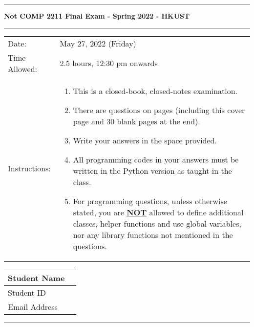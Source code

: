 \documentclass[11pt]{exam}
\begin{document}
\begin{center}
\rule{\textwidth}{2.5pt}

\textbf{\Large{Not COMP 2211 Final Exam - Spring 2022 - HKUST}}
\vspace{-0.2cm}
\rule{\textwidth}{2.5pt}

\vspace{0.3cm}
\renewcommand{\arraystretch}{1.2}
\sffamily
\begin{tabular}{lp{14.5cm}}
    Date: & May 27, 2022 (Friday) \\
    Time Allowed: & 2.5 hours, 12:30 pm onwards \\
    Instructions: & \begin{enumerate}[leftmargin=*,]
        \item This is a closed-book, closed-notes examination.
        \item There are \textbf{\underline{\rmfamily 8}} questions on \textbf{\rmfamily \pageref{LastPage}} pages (including this cover page and 30 blank \newline pages at the end).
        \item Write your answers in the space provided.
        \item All programming codes in your answers must be written in the Python version \newline as taught in the class.
        \item For programming questions, unless otherwise stated, you are \textbf{\underline{\rmfamily NOT}} allowed \newline to define additional classes, helper functions and use global variables, nor any \newline library functions not mentioned in the questions.
    \end{enumerate}\\
\end{tabular}
\rmfamily

\renewcommand{\arraystretch}{1.8}
\begin{tabular}{|l|p{9cm}|}
    \hline
    Student Name & \\
    \hline
    Student ID & \\
    \hline
    Email Address & \\
    \hline
\end{tabular}

\vspace{0.5cm}

\rule{\textwidth}{1pt}
\vspace{0.5cm}


\end{center}
\end{document}
